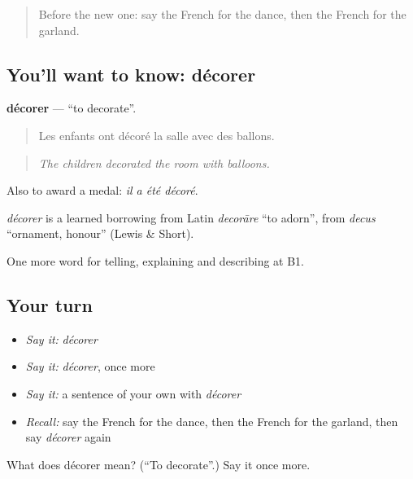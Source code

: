 \label{lesson:FR-C318-decorer}



\begin{quote}
Before the new one: say the French for the dance, then the French for the garland.
\end{quote}

\subsection*{You'll want to know: décorer}
\textbf{décorer} — \textquotedblleft{}to decorate\textquotedblright{}.

\begin{quote}
Les enfants ont décoré la salle avec des ballons.
\end{quote}

\begin{quote}
\emph{The children decorated the room with balloons.}
\end{quote}

Also to award a medal: \emph{il a été décoré}.

\begin{cousinweb}
\emph{décorer} is a learned borrowing from Latin \emph{decorāre} \textquotedblleft{}to adorn\textquotedblright{}, from \emph{decus} \textquotedblleft{}ornament, honour\textquotedblright{} (Lewis \& Short).
\end{cousinweb}

\begin{grammarlens}[title={What you've built}]
One more word for telling, explaining and describing at B1.
\end{grammarlens}

\subsection*{Your turn}
\begin{itemize}
\raggedright
  \item \emph{Say it:} \emph{décorer}
  \item \emph{Say it:} \emph{décorer}, once more
  \item \emph{Say it:} a sentence of your own with \emph{décorer}
  \item \emph{Recall:} say the French for the dance, then the French for the garland, then say \emph{décorer} again
\end{itemize}

\begin{tcolorbox}[breakable,colback=teal!4,colframe=teal!35!black,title={Before you move on}]
What does décorer mean? (\textquotedblleft{}To decorate\textquotedblright{}.) Say it once more.
\end{tcolorbox}
